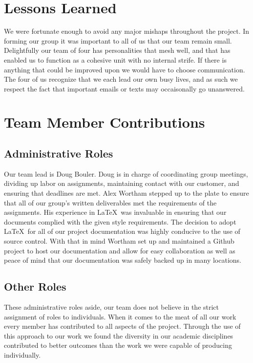 \documentclass[12pt,letterpaper]{article}
\begin{document}
\section{Lessons Learned}


We were fortunate enough to avoid any major mishaps throughout the project. In
forming our group it was important to all of us that our team remain small.
Delightfully our team of four has personalities that mesh well, and that has
enabled us to function as a cohesive unit with no internal strife.
If there is anything that could be improved upon we would have to choose
communication.  The four of us recognize that we each lead our own busy lives,
and as such we respect the fact that important emails or texts may occaisonally
go unanswered.


\section{Team Member Contributions}

\subsection{Administrative Roles}
Our team lead is Doug Bouler. Doug is in charge of coordinating group
meetings, dividing up labor on assignments, maintaining contact with our
customer, and ensuring that deadlines are met.  Alex Wortham stepped up to the
plate to ensure that all of our group's written deliverables met the
requirements of the assignments.  His experience in \LaTeX\ was invaluable in
ensuring that our documents complied with the given style requirements.  The
decision to adopt \LaTeX\ for all of our project documentation was highly
conducive to the use of source control.  With that in mind Wortham set up and
maintained a Github project to host our documentation and allow for easy
collaboration as well as peace of mind that our documentation was safely backed
up in many locations.

\subsection{Other Roles}
These administrative roles aside, our team does not
believe in the strict assignment of roles to individuals.  When it comes to the
meat of all our work every member has contributed to all aspects of the project.
Through the use of this approach to our work we found the diversity in our
academic disciplines contributed to better outcomes than the work we were
capable of producing individually. 
\end{document}
